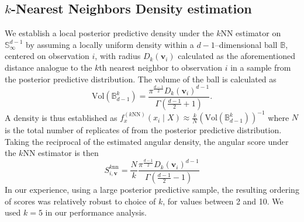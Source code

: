 
\subsection{$k$-Nearest Neighbors Density estimation}
We establish a local posterior predictive density under the $k$NN estimator 
    \citep{mack1979} on $\mathbb{S}_{\infty}^{d-1}$ by assuming a locally 
    uniform density within a $d-1$--dimensional ball $\mathbb{B}$, centered on 
    observation $i$, with radius $D_{k}(\bm{v}_i)$ calculated as the 
    aforementioned distance analogue 
    to the $k$th nearest neighbor to observation $i$ in a sample from the 
    posterior predictive distribution. The volume of the ball is calculated as
    \begin{equation}
        \label{eq:vol_sphere}
        \text{Vol}(\mathbb{B}_{d-1}^k) =
        \frac{\pi^{\frac{d-1}{2}}D_{k}(\bm{v}_i)^{d-1}}{
            \Gamma\left(\frac{d-1}{2} + 1\right)}.
    \end{equation}
    A density is thus established as 
    $f_{x}^{(k\text{NN})}(x_i\mid X) \approx 
        \frac{k}{N}\left(\text{Vol}(\mathbb{B}_{d-1}^k)\right)^{-1}$
    where $N$ is the total number of replicates of from the posterior predictive
    distribution.  Taking the reciprocal of the estimated angular density, 
    the angular score under the $k$NN estimator is then
    \begin{equation}
        \label{eq:ad_knn_h}
        S_{i,\bm{v}}^{\text{$k$nn}} = \frac{N}{k}
            \frac{\pi^{\frac{d-1}{2}}D_{k}(\bm{v}_i)^{d-1}}{
            \Gamma\left(\frac{d-1}{2} - 1\right)}
    \end{equation}
    In our experience, using a large posterior predictive sample, 
    the resulting ordering of scores was relatively robust to choice of $k$, for
    values between 2 and 10.  We used $k = 5$ in our performance analysis.
